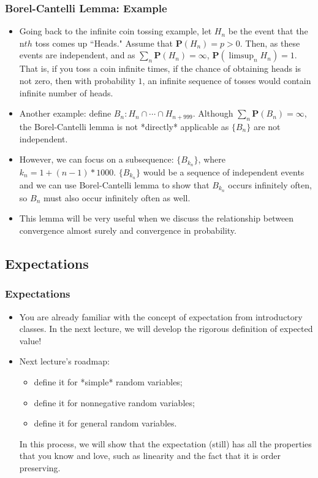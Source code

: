 \documentclass[handout]{beamer}
\newcommand{\BP}{\mathbf{P}}
\begin{document}
\frame
{
  \frametitle{Borel-Cantelli Lemma: Example}

   \begin{itemize}


\item<1-> Going back to the infinite coin tossing example, let $H_n$ be the event that the n$th$ toss comes up ``Heads." Assume that $\BP(H_n)=p>0$. Then, as these events are independent, and as $\sum_n \BP(H_n)=\infty$, $\BP(\limsup_n H_n)=1$. That is, if you toss a coin infinite times, if the chance of obtaining heads is not zero, then with probability $1$, an infinite sequence of tosses would contain infinite number of heads. 
                                                  
\item<2->  Another example: define $B_n : H_n \cap \cdots \cap H_{n+999}$.  Although $\sum_n \BP(B_n)=\infty$, the Borel-Cantelli lemma is not *directly* applicable as $\{B_n\}$ are not independent. 

\item<3->  However, we can focus on a subsequence: $\{B_{k_n}\}$, where $k_n=1+(n-1)*1000$. $\{B_{k_n}\}$ would be a sequence of independent events and we can use Borel-Cantelli lemma to show that $B_{k_n}$ occurs infinitely often, so $B_n$ must also occur infinitely often as well.
               
\item<3-> This lemma will be very useful when we discuss the relationship between convergence almost surely and convergence in probability.                 

\end{itemize}
}

\subsection{Expectations}


\frame
{
  \frametitle{Expectations}

   \begin{itemize}


\item<1-> You are already familiar with the concept of expectation from introductory classes. In the next lecture, we will develop the rigorous definition of expected value! 
                       
\item<2-> Next lecture's roadmap: 
\begin{itemize}
\item define it for *simple* random variables;
\item define it for nonnegative random variables;
\item define it for general random variables.
\end{itemize}

In this process, we will show that the expectation (still) has all the properties that you know and love, such as linearity and the fact that it is order preserving. 

\end{itemize}
}
\end{document}
